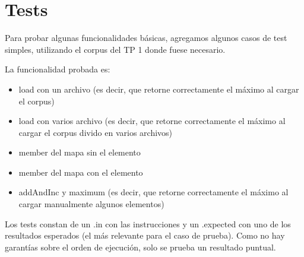 \section{Tests}

Para probar algunas funcionalidades básicas, agregamos algunos casos de test simples, utilizando el corpus del TP 1 donde fuese necesario.

La funcionalidad probada es:

\begin{itemize}
	\item load con un archivo (es decir, que retorne correctamente el máximo al cargar el corpus)
	\item load con varios archivo (es decir, que retorne correctamente el máximo al cargar el corpus divido en varios archivos)
	\item member del mapa sin el elemento
	\item member del mapa con el elemento
	\item addAndInc y maximum (es decir, que retorne correctamente el máximo al cargar manualmente algunos elementos)
\end{itemize}

Los tests constan de un .in con las instrucciones y un .expected con uno de los resultados esperados (el más relevante para el caso de prueba). Como no hay garantías sobre el orden de ejecución, solo se prueba un resultado puntual.
